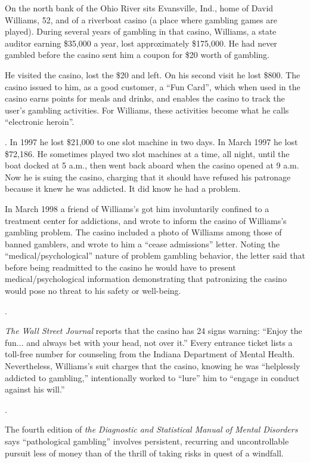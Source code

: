\TiGanSpace


On the north bank of the Ohio River sits Evansville, Ind., home of David
Williams, 52, and of a riverboat casino (a place where gambling games
are played). During several years of gambling in that casino, Williams,
a state auditor earning \$35,000 a year, lost approximately \$175,000.
He had never gambled before the casino sent him a coupon for \$20 worth
of gambling.

He visited the casino, lost the \$20 and left. On his second visit he
lost \$800. The casino issued to him, as a good customer, a ``Fun
Card'', which when used in the casino earns points for meals and drinks,
and enables the casino to track the user's gambling activities. For
Williams, these activities become what he calls ``electronic heroin''.

\linefill. In 1997 he lost \$21,000 to one slot machine in
two days. In March 1997 he lost \$72,186. He sometimes played two slot
machines at a time, all night, until the boat docked at 5 a.m., then
went back aboard when the casino opened at 9 a.m. Now he is suing the
casino, charging that it should have refused his patronage because it
knew he was addicted. It did know he had a problem.

In March 1998 a friend of Williams's got him involuntarily confined to a
treatment center for addictions, and wrote to inform the casino of
Williams's gambling problem. The casino included a photo of Williams
among those of banned gamblers, and wrote to him a ``cease admissions''
letter. Noting the ``medical/psychological'' nature of problem gambling
behavior, the letter said that before being readmitted to the casino he
would have to present medical/psychological information demonstrating
that patronizing the casino would pose no threat to his safety or
well-being.

\linefill.

\emph{The Wall Street Journal} reports that the casino has 24 signs
warning: ``Enjoy the fun... and always bet with your head, not over
it.'' Every entrance ticket lists a toll-free number for counseling from
the Indiana Department of Mental Health. Nevertheless, Williams's suit
charges that the casino, knowing he was ``helplessly addicted to
gambling,'' intentionally worked to ``lure'' him to ``engage in conduct
against his will.''

\linefill.

The fourth edition of \emph{the Diagnostic and Statistical Manual of
	Mental Disorders} says ``pathological gambling'' involves persistent,
recurring and uncontrollable pursuit less of money than of the thrill of
taking risks in quest of a windfall.

